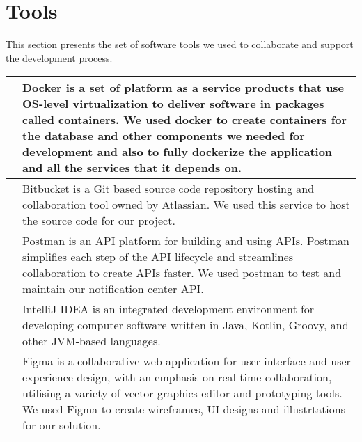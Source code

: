 \chapter{Tools}
\label{appendix:tools}
This section presents the set of software tools we used to collaborate and support the development process. \\

\begin{longtable}{ | m{} | m{} | }
      \hline
      \centering    & Docker is a set of platform as a service products that use OS-level virtualization to deliver software in packages called containers. We used docker to create containers for the database and other components we needed for development and also to fully dockerize the application and all the services that it depends on. \\
      \hline
      \centering & Bitbucket is a Git based source code repository hosting and collaboration tool owned by Atlassian. We used this service to host the source code for our project.                                                                                                                                                               \\
      \hline
      \centering   & Postman is an API platform for building and using APIs. Postman simplifies each step of the API lifecycle and streamlines collaboration to create APIs faster. We used postman to test and maintain our notification center API.                                                                                               \\
      \hline
      \centering  & IntelliJ IDEA is an integrated development environment for developing computer software written in Java, Kotlin, Groovy, and other JVM-based languages.                                                                                                                                                                        \\
      \hline
      \centering     & Figma is a collaborative web application for user interface and user experience design, with an emphasis on real-time collaboration, utilising a variety of vector graphics editor and prototyping tools. We used Figma to create wireframes, UI designs and illustrtations for our solution.                                  \\
      \hline

\end{longtable}
